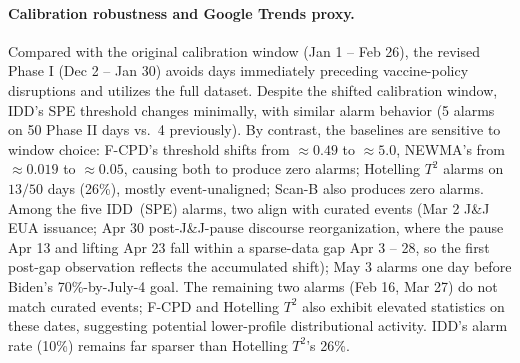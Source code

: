 \documentclass{article}
\newcommand{\algoname}{\textsc{IDD}\xspace}
\newcommand{\rev}[1]{\textcolor{black}{#1}}
\theoremstyle{plain}
\theoremstyle{definition}
\theoremstyle{remark}
\begin{document}
\begin{table}[t]
\centering
\caption{\rev{Curated COVID-19 vaccine-policy events during the Phase II monitoring window (Jan 31 -- May 5, 2021).}}
\label{tab:reddit_events}
\end{table}

\paragraph{Calibration robustness and Google Trends proxy.}
Compared with the original calibration window (Jan 1 -- Feb 26), the revised Phase I (Dec 2 -- Jan 30) avoids days immediately preceding vaccine-policy disruptions and utilizes the full dataset. Despite the shifted calibration window, \algoname's SPE threshold changes minimally, with similar alarm behavior (5 alarms on 50 Phase II days vs.\ 4 previously). By contrast, the baselines are sensitive to window choice: F-CPD's threshold shifts from $\approx 0.49$ to $\approx 5.0$, NEWMA's from $\approx 0.019$ to $\approx 0.05$, causing both to produce zero alarms; Hotelling $T^2$ alarms on $13/50$ days (26\%), mostly event-unaligned; Scan-B also produces zero alarms. Among the five \algoname\ (SPE) alarms, two align with curated events (Mar 2 J\&J EUA issuance; Apr 30 post-J\&J-pause discourse reorganization, where the pause Apr 13 and lifting Apr 23 fall within a sparse-data gap Apr 3 -- 28, so the first post-gap observation reflects the accumulated shift); May 3 alarms one day before Biden's 70\%-by-July-4 goal. The remaining two alarms (Feb 16, Mar 27) do not match curated events; F-CPD and Hotelling $T^2$ also exhibit elevated statistics on these dates, suggesting potential lower-profile distributional activity. \algoname's alarm rate (10\%) remains far sparser than Hotelling $T^2$'s 26\%.
\end{document}
